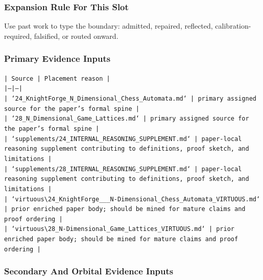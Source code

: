 \documentclass[11pt]{article}
\begin{document}
\subsubsection*{Expansion Rule For This Slot}

Use past work to type the boundary: admitted, repaired, reflected, calibration-required, falsified, or routed onward.

\subsubsection*{Primary Evidence Inputs}

\noindent\texttt{| Source | Placement reason |}\\
\noindent\texttt{|---|---|}\\
\noindent\texttt{| `24\_KnightForge\_N\_Dimensional\_Chess\_Automata.md` | primary assigned source for the paper's formal spine |}\\
\noindent\texttt{| `28\_N\_Dimensional\_Game\_Lattices.md` | primary assigned source for the paper's formal spine |}\\
\noindent\texttt{| `supplements/24\_INTERNAL\_REASONING\_SUPPLEMENT.md` | paper-local reasoning supplement contributing to definitions, proof sketch, and limitations |}\\
\noindent\texttt{| `supplements/28\_INTERNAL\_REASONING\_SUPPLEMENT.md` | paper-local reasoning supplement contributing to definitions, proof sketch, and limitations |}\\
\noindent\texttt{| `virtuous\textbackslash{}24\_KnightForge\_\_\_N-Dimensional\_Chess\_Automata\_VIRTUOUS.md` | prior enriched paper body; should be mined for mature claims and proof ordering |}\\
\noindent\texttt{| `virtuous\textbackslash{}28\_N-Dimensional\_Game\_Lattices\_VIRTUOUS.md` | prior enriched paper body; should be mined for mature claims and proof ordering |}\\

\subsubsection*{Secondary And Orbital Evidence Inputs}
\end{document}

